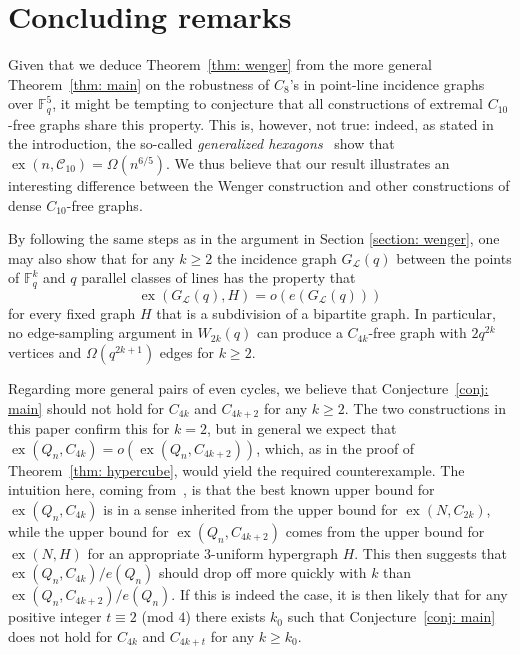 \documentclass[A4paper,reqno,oneside,11pt]{amsart}
\theoremstyle{plain}
\theoremstyle{definition}
\newcommand{\scC}{\mathscr{C}}
\newcommand{\scL}{\mathscr{L}}
\newcommand{\F}{\mathbb{F}}
\newcommand{\ex}{\operatorname{ex}}
\def\l{\ell}
\begin{document}
\vspace{-5mm} 

\section{Concluding remarks}
\label{section: conclusion}

Given that we deduce Theorem~\ref{thm: wenger} from the more general Theorem~\ref{thm: main} on the robustness of $C_8$'s in point-line incidence graphs over $\F_q^5$, it might be tempting to conjecture that all constructions of extremal $C_{10}$-free graphs share this property.
This is, however, not true: indeed, as stated in the introduction, the so-called {\it generalized hexagons}~\cite{LUW99} show that $\ex(n, \scC_{10}) = \Omega(n^{6/5})$. We thus believe that our result illustrates an interesting difference between the Wenger construction and other constructions of dense $C_{10}$-free graphs. 

By following the same steps as in the argument in Section \ref{section: wenger}, one may also show that for any $k \geq 2$ the incidence graph $G_\scL(q)$ between the points of $\F_q^k$ and $q$ parallel classes of lines has the property that
    \begin{equation*}
        \ex(G_\scL(q), H) = o(e(G_\scL(q)))
    \end{equation*}
for every fixed graph $H$ that is a subdivision of a bipartite graph. 
In particular, no edge-sampling argument in $W_{2k}(q)$ can produce a $C_{4k}$-free graph with $2q^{2k}$ vertices and $\Omega(q^{2k+1})$ edges for $k\geq 2$. 

Regarding more general pairs of even cycles, we believe that Conjecture~\ref{conj: main} should not hold for $C_{4k}$ and $C_{4k+2}$ for any $k \geq 2$. 
The two constructions in this paper confirm this for $k = 2$, but in general we expect that $\ex(Q_n,C_{4k}) = o(\ex(Q_n,C_{4k+2}))$, which, as in the proof of Theorem~\ref{thm: hypercube}, would yield the required counterexample. 
The intuition here, coming from~\cite{Con10}, is that the best known upper bound for $\ex(Q_n,C_{4k})$ is in a sense inherited from the upper bound for $\ex(N,C_{2k})$, while the upper bound for $\ex(Q_n,C_{4k+2})$ comes from the upper bound for $\ex(N,H)$ for an appropriate $3$-uniform hypergraph $H$. 
This then suggests that $\ex(Q_n,C_{4k})/e(Q_n)$ should drop off more quickly with $k$ than  $\ex(Q_n,C_{4k+2})/e(Q_n)$. 
If this is indeed the case, it is then likely that for any positive integer $t \equiv 2$ (mod $4$) there exists $k_0$ such that Conjecture~\ref{conj: main} does not hold for $C_{4k}$ and $C_{4k+t}$ for any $k \geq k_0$.
\end{document}
